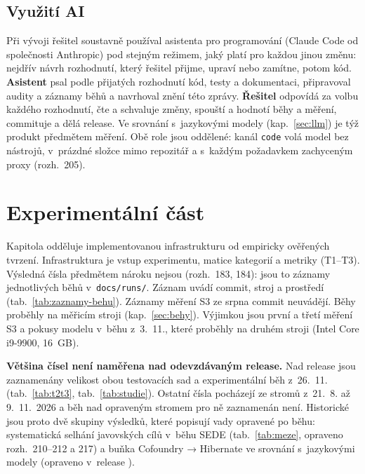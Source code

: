 \subsection{Využití AI}\label{sec:ai}

Při vývoji řešitel soustavně používal asistenta pro programování (Claude Code od společnosti Anthropic) pod stejným režimem, jaký platí pro každou jinou změnu: nejdřív návrh rozhodnutí, který řešitel přijme, upraví nebo zamítne, potom kód. \textbf{Asistent} psal podle přijatých rozhodnutí kód, testy a dokumentaci, připravoval audity a záznamy běhů a navrhoval znění této zprávy. \textbf{Řešitel} odpovídá za volbu každého rozhodnutí, čte a schvaluje změny, spouští a hodnotí běhy a měření, commituje a dělá release. Ve srovnání s~jazykovými modely (kap.~\ref{sec:llm}) je týž produkt předmětem měření. Obě role jsou oddělené: kanál \texttt{code} volá model bez nástrojů, v~prázdné složce mimo repozitář a s~každým požadavkem zachyceným proxy (rozh.~205).

\section{Experimentální část}\label{sec:exp}

Kapitola odděluje implementovanou infrastrukturu od empiricky ověřených tvrzení. Infrastruktura je vstup experimentu, matice kategorií a metriky (T1--T3). Výsledná čísla předmětem nároku nejsou (rozh.~183, 184): jsou to záznamy jednotlivých běhů v~\texttt{docs/runs/}. Záznam uvádí commit, stroj a prostředí (tab.~\ref{tab:zaznamy-behu}). Záznamy měření S3 ze srpna commit neuvádějí. Běhy proběhly na měřicím stroji (kap.~\ref{sec:behy}). Výjimkou jsou první a třetí měření S3 a pokusy modelu v~běhu z~3.~11., které proběhly na druhém stroji (Intel Core i9-9900, 16~GB).

\textbf{Většina čísel není naměřena nad odevzdávaným release.} Nad release \texttt{\Vydani} jsou zaznamenány velikost obou testovacích sad a experimentální běh z~26.~11. (tab.~\ref{tab:t2t3}, tab.~\ref{tab:studie}). Ostatní čísla pocházejí ze stromů z~21.~8. až 9.~11.~2026 a běh nad opraveným stromem pro ně zaznamenán není. Historické jsou proto dvě skupiny výsledků, které popisují vady opravené po běhu: systematická selhání javovských cílů v~běhu SEDE (tab.~\ref{tab:meze}, opraveno rozh.~210--212 a 217) a buňka Cofoundry → Hibernate ve srovnání s~jazykovými modely (opraveno v~release \texttt{\Vydani}).

